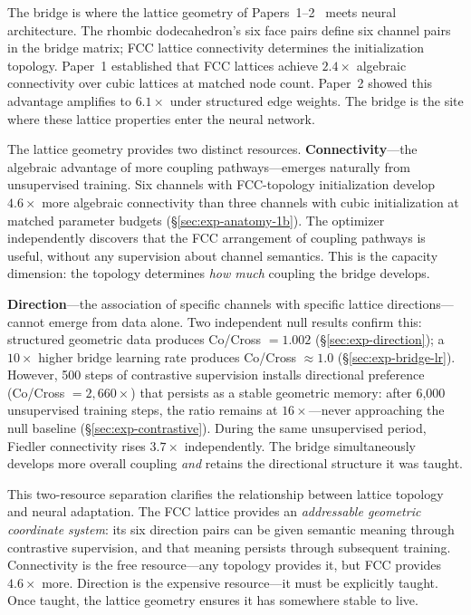 The bridge is where the lattice geometry of
Papers~1--2~\cite{rhombilora_paper1, rhombilora_paper2} meets
neural architecture. The rhombic dodecahedron's six face pairs
define six channel pairs in the bridge matrix; FCC lattice
connectivity determines the initialization topology. Paper~1
established that FCC lattices achieve $2.4\times$ algebraic
connectivity over cubic lattices at matched node count. Paper~2
showed this advantage amplifies to $6.1\times$ under structured
edge weights. The bridge is the site where these lattice properties
enter the neural network.

The lattice geometry provides two distinct resources.
\textbf{Connectivity}---the algebraic advantage of more coupling
pathways---emerges naturally from unsupervised training. Six
channels with FCC-topology initialization develop $4.6\times$
more algebraic connectivity than three channels with cubic
initialization at matched parameter budgets (\S\ref{sec:exp-anatomy-1b}).
The optimizer independently discovers that the FCC arrangement of
coupling pathways is useful, without any supervision about channel
semantics. This is the capacity dimension: the topology determines
\emph{how much} coupling the bridge develops.

\textbf{Direction}---the association of specific channels with
specific lattice directions---cannot emerge from data alone. Two
independent null results confirm this: structured geometric data
produces Co/Cross $= 1.002$ (\S\ref{sec:exp-direction}); a
$10\times$ higher bridge learning rate produces Co/Cross
$\approx 1.0$ (\S\ref{sec:exp-bridge-lr}). However, 500 steps
of contrastive supervision installs directional preference
(Co/Cross $= 2{,}660\times$) that persists as a stable geometric
memory: after 6{,}000 unsupervised training steps, the ratio
remains at $16\times$---never approaching the null baseline
(\S\ref{sec:exp-contrastive}). During the same unsupervised
period, Fiedler connectivity rises $3.7\times$ independently.
The bridge simultaneously develops more overall coupling
\emph{and} retains the directional structure it was taught.

This two-resource separation clarifies the relationship between
lattice topology and neural adaptation. The FCC lattice provides
an \emph{addressable geometric coordinate system}: its six
direction pairs can be given semantic meaning through contrastive
supervision, and that meaning persists through subsequent training.
Connectivity is the free resource---any topology provides it, but
FCC provides $4.6\times$ more. Direction is the expensive
resource---it must be explicitly taught. Once taught, the lattice
geometry ensures it has somewhere stable to live.

